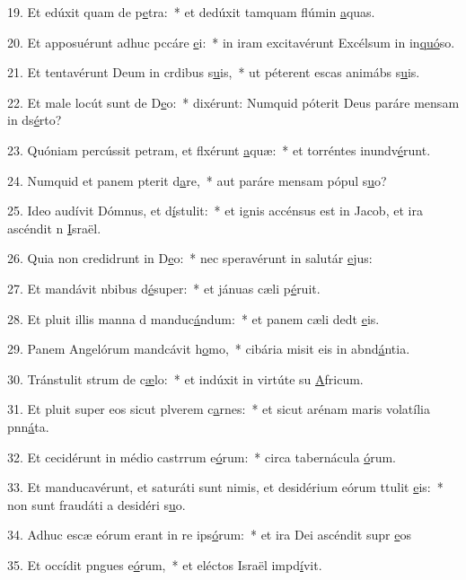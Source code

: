 19. Et edúxit quam de p\uline{e}tra:~* et dedúxit tamquam flúmin \uline{a}quas.\par 
20. Et apposuérunt adhuc pccáre \uline{e}i:~* in iram excitavérunt Excélsum in in\uline{quó}so.\par 
21. Et tentavérunt Deum in crdibus s\uline{u}is,~* ut péterent escas animábs s\uline{u}is.\par 
22. Et male locút sunt de D\uline{e}o:~* dixérunt: Numquid póterit Deus paráre mensam in ds\uline{é}rto?\par 
23. Quóniam percússit petram, et flxérunt \uline{a}quæ:~* et torréntes inundv\uline{é}runt.\par 
24. Numquid et panem pterit d\uline{a}re,~* aut paráre mensam pópul s\uline{u}o?\par 
25. Ideo audívit Dómnus, et d\uline{í}stulit:~* et ignis accénsus est in Jacob, et ira ascéndit n \uline{I}sraël.\par 
26. Quia non credidrunt in D\uline{e}o:~* nec speravérunt in salutár \uline{e}jus:\par 
27. Et mandávit nbibus d\uline{é}super:~* et jánuas cæli p\uline{é}ruit.\par 
28. Et pluit illis manna d manduc\uline{á}ndum:~* et panem cæli dedt \uline{e}is.\par 
29. Panem Angelórum mandcávit h\uline{o}mo,~* cibária misit eis in abnd\uline{á}ntia.\par 
30. Tránstulit strum de c\uline{æ}lo:~* et indúxit in virtúte su \uline{A}fricum.\par 
31. Et pluit super eos sicut plverem c\uline{a}rnes:~* et sicut arénam maris volatília pnn\uline{á}ta.\par 
32. Et cecidérunt in médio castrrum e\uline{ó}rum:~* circa tabernácula \uline{ó}rum.\par 
33. Et manducavérunt, et saturáti sunt nimis, et desidérium eórum ttulit \uline{e}is:~* non sunt fraudáti a desidéri s\uline{u}o.\par 
34. Adhuc escæ eórum erant in re ips\uline{ó}rum:~* et ira Dei ascéndit supr \uline{e}os\par 
35. Et occídit pngues e\uline{ó}rum,~* et eléctos Israël impd\uline{í}vit.\par 
